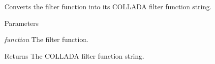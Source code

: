 \label{namespaceFUDaeTextureFilterFunction_aff1f69db827a3b3dabb2aa04abbc2c0f}
Converts the filter function into its COLLADA filter function string. 
\begin{DoxyParams}{Parameters}
\item[{\em function}]The filter function. \end{DoxyParams}
\begin{DoxyReturn}{Returns}
The COLLADA filter function string. 
\end{DoxyReturn}

